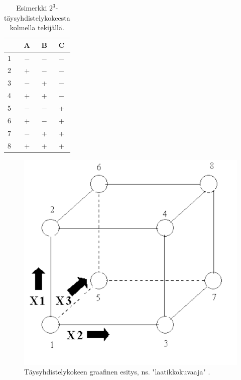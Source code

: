 \documentclass[12pt,a4paper,finnish]{tutthesis}
\begin{document}
\begin{table}[h]
  \begin{center}
  \caption{Esimerkki $2^3$-täysyhdistelykokeesta kolmella tekijällä.}
  \label{tab:fullf}
  \begin{tabular}{ | l | c | c | c | }
    \hline
     & \textbf{A} & \textbf{B} & \textbf{C} \\ \hline
    1 & $-$ & $-$ & $-$\\ \hline
    2 & + & $-$ & $-$\\ \hline
    3 & $-$ & + & $-$\\ \hline
    4 & + & + & $-$\\ \hline
    5 & $-$ & $-$ & +\\ \hline
    6 & + & $-$ & +\\ \hline
    7 & $-$ & + & +\\ \hline
    8 & + & + & +\\ \hline
  \end{tabular}
  \end{center}
\end{table}





\begin{figure}[h]
  \begin{center}
    \includegraphics[scale=0.6]{cube}
  \end{center}
  \caption[Laatikkokuvaaja]{Täysyhdistelykokeen graafinen esitys, ns. "laatikkokuvaaja" \parencite{ehandbook}.}
  \label{fig:cube}
\end{figure}
\end{document}
